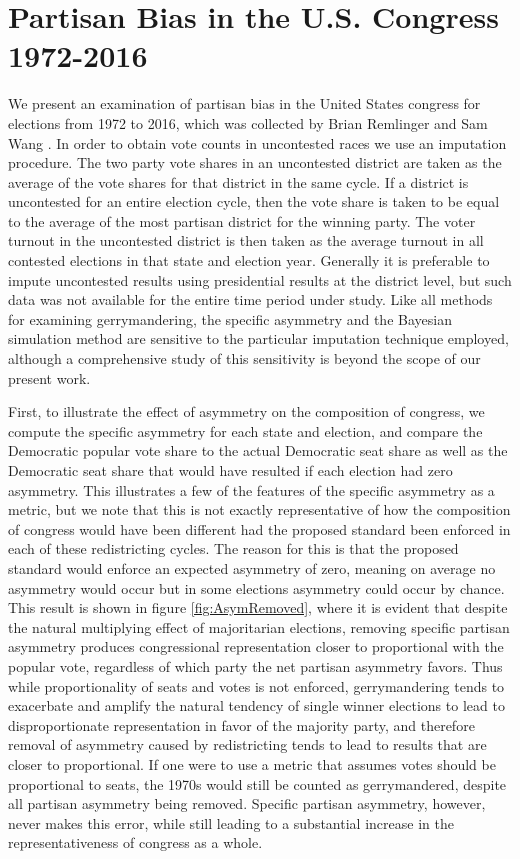 \documentclass[preprint,12pt]{article}
\begin{document}
\section{Partisan Bias in the U.S. Congress 1972-2016\label{sec:Hist}}
We present an examination of partisan bias in the United States congress for elections from 1972 to 2016, which was collected by Brian Remlinger and Sam Wang \cite{Remliger_2017_}.
In order to obtain vote counts in uncontested races we use an imputation procedure.
The two party vote shares in an uncontested district are taken as the average of the vote shares for that district in the same cycle.
If a district is uncontested for an entire election cycle, then the vote share is taken to be equal to the average of the most partisan district for the winning party.
The voter turnout in the uncontested district is then taken as the average turnout in all contested elections in that state and election year.
Generally it is preferable to impute uncontested results using presidential results at the district level, but such data was not available for the entire time period under study.
Like all methods for examining gerrymandering, the specific asymmetry and the Bayesian simulation method are sensitive to the particular imputation technique employed, although a comprehensive study of this sensitivity is beyond the scope of our present work.

First, to illustrate the effect of asymmetry on the composition of congress, we compute the specific asymmetry for each state and election, and compare the Democratic popular vote share to the actual Democratic seat share as well as the Democratic seat share that would have resulted if each election had zero asymmetry.
This illustrates a few of the features of the specific asymmetry as a metric, but we note that this is not exactly representative of how the composition of congress would have been different had the proposed standard been enforced in each of these redistricting cycles.
The reason for this is that the proposed standard would enforce an expected asymmetry of zero, meaning on average no asymmetry would occur but in some elections asymmetry could occur by chance.
This result is shown in figure \ref{fig:AsymRemoved}, where it is evident that despite the natural multiplying effect of majoritarian elections, removing specific partisan asymmetry produces congressional representation closer to proportional with the popular vote, regardless of which party the net partisan asymmetry favors.  
Thus while proportionality of seats and votes is not enforced, gerrymandering tends to exacerbate and amplify the natural tendency of single winner elections to lead to disproportionate representation in favor of the majority party, and therefore removal of asymmetry caused by redistricting tends to lead to results that are closer to proportional.
If one were to use a metric that assumes votes should be proportional to seats, the 1970s would still be counted as gerrymandered, despite all partisan asymmetry being removed.  
Specific partisan asymmetry, however, never makes this error, while still leading to a substantial increase in the representativeness of congress as a whole.
\end{document}
